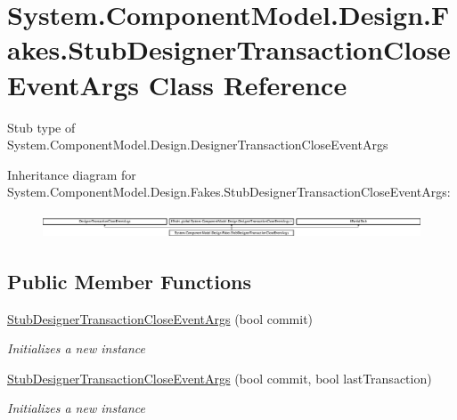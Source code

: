 \hypertarget{class_system_1_1_component_model_1_1_design_1_1_fakes_1_1_stub_designer_transaction_close_event_args}{\section{System.\-Component\-Model.\-Design.\-Fakes.\-Stub\-Designer\-Transaction\-Close\-Event\-Args Class Reference}
\label{class_system_1_1_component_model_1_1_design_1_1_fakes_1_1_stub_designer_transaction_close_event_args}
}


Stub type of System.\-Component\-Model.\-Design.\-Designer\-Transaction\-Close\-Event\-Args 


Inheritance diagram for System.\-Component\-Model.\-Design.\-Fakes.\-Stub\-Designer\-Transaction\-Close\-Event\-Args\-:\begin{figure}[H]
\begin{center}
\leavevmode
\includegraphics[height=0.736358cm]{class_system_1_1_component_model_1_1_design_1_1_fakes_1_1_stub_designer_transaction_close_event_args}
\end{center}
\end{figure}
\subsection*{Public Member Functions}
\begin{DoxyCompactItemize}
\item 
\hyperlink{class_system_1_1_component_model_1_1_design_1_1_fakes_1_1_stub_designer_transaction_close_event_args_acfd7743524ed50bc2fd8ffa7beb2f19b}{Stub\-Designer\-Transaction\-Close\-Event\-Args} (bool commit)
\begin{DoxyCompactList}\small\item\em Initializes a new instance\end{DoxyCompactList}\item 
\hyperlink{class_system_1_1_component_model_1_1_design_1_1_fakes_1_1_stub_designer_transaction_close_event_args_ac99d910921d511de7a33bbc557b2cb3a}{Stub\-Designer\-Transaction\-Close\-Event\-Args} (bool commit, bool last\-Transaction)
\begin{DoxyCompactList}\small\item\em Initializes a new instance\end{DoxyCompactList}\end{DoxyCompactItemize}
